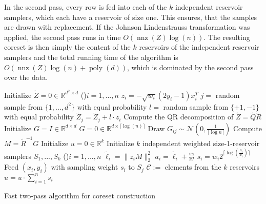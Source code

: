 In the second pass, every row is fed into each of the
$k$ independent reservoir samplers, which each have a reservoir
of size one. This ensures, that the samples are drawn
with replacement. If the Johnson Lindenstrauss transformation
was applied, the second pass runs in time
$O(\operatorname{nnz}(Z) \log(n))$.
The resulting coreset is then simply the content of the
$k$ reservoirs of the independent reservoir samplers
and the total running time of the algorithm is
$O(\operatorname{nnz}(Z) \log(n) + \operatorname{poly}(d))$,
which is dominated by the second pass over the data.

\begin{algorithm}
    \DontPrintSemicolon
    Initialize $\tilde{Z} = 0 \in \mathbb{R}^{d^2 \times d}$ \;
    \For(){$i = 1,...,n$}{
        $z_i = -\sqrt{w_i}(2y_i - 1)x_i^T$
        $j = $ random sample from $\{1, ..., d^2\}$ with equal probability \;
        $l = $ random sample from $\{+1, -1\}$ with equal probability \;
        $\tilde{Z}_j = \tilde{Z}_j + l \cdot z_i$
    }
    Compute the QR decomposition of $\tilde{Z} = \tilde{Q}\tilde{R}$ \;
    Initialize $G = I \in \mathbb{R}^{d \times d}$ \;
     {
        $G = 0 \in \mathbb{R}^{d \times \lceil\log(n)\rceil}$ \;
        Draw $G_{ij} \sim \mathcal{N}(0, \frac{1}{\lceil\log{n}\rceil})$
    }
    Compute $M = \tilde{R}^{-1} G$ \;
    Initialize $u = 0 \in \mathbb{R}^k$
    Initialize $k$ independent weighted size-1-reservoir samplers $S_1, ..., S_k$ \;
    \For(){$i = 1, ..., n$}{
        $\tilde{\ell}_i = \lVert z_i M\rVert_2^2$
        $a_i = \tilde{\ell}_i + \frac{w_i}{\mathcal{W}}$
        $s_i = w_i 2^{\lceil\log(\frac{a_i}{w_i})\rceil}$
         {
            Feed $(x_i, y_i)$ with sampling weight $s_i$ to $S_j$ \;
        }
    }
    $\mathcal{C} := $ elements from the $k$ reservoirs \;
    $u = u \cdot \sum_{i=1}^n s_i$
    \caption{Fast two-pass algorithm for coreset construction\label{algo:two-pass}}
\end{algorithm}

